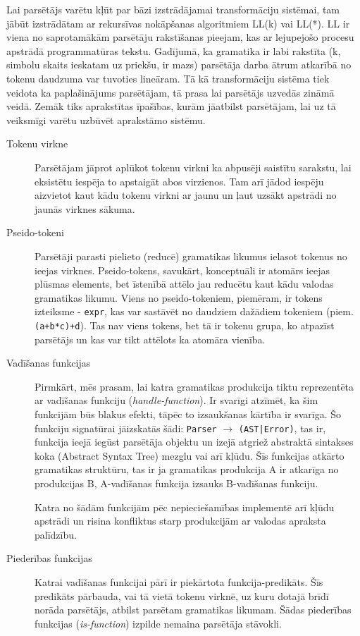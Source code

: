 Lai parsētājs varētu kļūt par bāzi izstrādājamai transformāciju sistēmai, tam jābūt izstrādātam ar rekursīvas nokāpšanas algoritmiem LL(k) vai LL(*). LL ir viena no saprotamākām parsētāju rakstīšanas pieejam, kas ar lejupejošo procesu apstrādā programmatūras tekstu. Gadījumā, ka gramatika ir labi rakstīta (k, simbolu skaits ieskatam uz priekšu, ir mazs) parsētāja darba ātrum atkarībā no tokenu daudzuma var tuvoties lineāram. \cite{Lewis:LLParsers}
Tā kā transformāciju sistēma tiek veidota ka paplašinājums parsētājam, tā prasa lai parsētājs uzvedās zināmā veidā. Zemāk tiks aprakstītas īpašības, kurām jāatbilst parsētājam, lai uz tā veiksmīgi varētu uzbūvēt aprakstāmo sistēmu.
\begin{description}
\item[Tokenu virkne]
Parsētājam jāprot aplūkot tokenu virkni ka abpusēji saistītu sarakstu, lai eksistētu iespēja to apstaigāt abos virzienos. Tam arī jādod iespēju aizvietot kaut kādu tokenu virkni ar jaunu un ļaut uzsākt apstrādi no jaunās virknes sākuma.
\item[Pseido-tokeni]
Parsētāji parasti pielieto (reducē) gramatikas likumus ielasot tokenus no ieejas virknes. Pseido-tokens, savukārt, konceptuāli ir atomārs ieejas plūsmas elements, bet īstenībā attēlo jau reducētu kaut kādu valodas gramatikas likumu. Viens no pseido-tokeniem, piemēram, ir tokens izteiksme - \verb|expr|, kas var sastāvēt no daudziem dažādiem tokeniem (piem. \verb|(a+b*c)+d|). Tas nav viens tokens, bet tā ir tokenu grupa, ko atpazīst parsētājs un kas var tikt attēlots ka atomāra vienība.
\item[Vadīšanas funkcijas]
Pirmkārt, mēs prasam, lai katra gramatikas produkcija tiktu reprezentēta ar vadīšanas funkciju (\emph{handle-function}). Ir svarīgi atzīmēt, ka šim funkcijām būs blakus efekti, tāpēc to izsaukšanas kārtība ir svarīga. Šo funkciju signatūrai jāizskatās šādi: \verb|Parser| $\to$ \verb/(AST|Error)/, tas ir, funkcija ieejā iegūst parsētāja objektu un izejā atgriež abstraktā sintakses koka (Abstract Syntax Tree) mezglu vai arī kļūdu. Šīs funkcijas atkārto gramatikas struktūru, tas ir ja gramatikas produkcija A ir atkarīga no produkcijas B, A-vadīšanas funkcija izsauks B-vadīšanas funkciju. 

Katra no šādām funkcijām pēc nepieciešamības implementē arī kļūdu apstrādi un risina konfliktus starp produkcijām ar valodas apraksta palīdzību.
\item[Piederības funkcijas]
Katrai vadīšanas funkcijai pārī ir piekārtota funkcija-predikāts. Šīs predikāts pārbauda, vai tā vietā tokenu virknē, uz kuru dotajā brīdī norāda parsētājs, atbilst parsētam gramatikas likumam. Šādas piederības funkcijas (\emph{is-function}) izpilde nemaina parsētāja stāvokli. 


\end{description}
